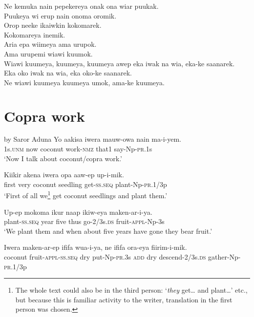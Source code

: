 Ne kemuka nain pepekereya onak ona wiar puukak. \\
Puukeya wi erup nain onoma oromik. \\
Orop neeke ikaiwkin kokomarek. \\
Kokomareya inemik. \\
Aria epa wiimeya ama urupok. \\
Ama urupemi wiawi kuumok. \\
Wiawi kuumeya, kuumeya, kuumeya awep eka iwak na wia, eka-ke saanarek. \\
Eka oko iwak na wia, eka oko-ke saanarek. \\
Ne wiawi kuumeya kuumeya umok, ama-ke kuumeya. \\
\setcounter{equation}{0}
\section{Copra work} 
   by Saror Aduna 
\ea\label{ex:a:x1}
\gll  Yo  aakisa  iwera  mauw-owa  nain  ma-i-yem. \\
1s.\textsc{unm}  now  coconut  work-\textsc{nmz}  that1  say-Np-\textsc{pr}.1s \\ 
\glt ‘Now I talk about coconut/copra work.’ \\
\z


\ea\label{ex:a:x2}
\gll  Kiikir  akena  iwera  opa  aaw-ep  up-i-mik. \\
first  very  coconut  seedling  get-\textsc{ss.seq}  plant-Np-\textsc{pr}.1/3p \\
\glt ‘First of all we\footnote{ The whole text could also be in the third person: ‘\textit{they} get… and plant…’  etc., but because this is familiar activity to the writer, translation in the first person was chosen.} get coconut seedlings and plant them.’ \\
\z


\ea\label{ex:a:x3}
\gll  Up-ep  mokoma  ikur  naap  ikiw-eya  maken-ar-i-ya. \\
plant-\textsc{ss.seq}  year  five  thus  go-2/3s.\textsc{ds}  fruit-\textsc{appl}-Np-3s \\
\glt ‘We plant them and when about five years have gone they bear fruit.’ \\
\z


\ea\label{ex:a:x4}
\gll  Iwera  maken-ar-ep  ififa  wua-i-ya,  ne  ififa  ora-eya            fiirim-i-mik. \\
coconut  fruit-\textsc{appl}-\textsc{ss.seq}  dry  put-Np-\textsc{pr}.3s  \textsc{add}  dry  descend-2/3s.\textsc{ds}  gather-Np-\textsc{pr}.1/3p \\


